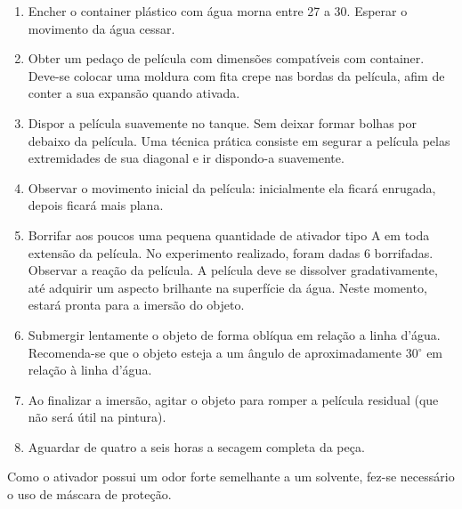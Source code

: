 \begin{enumerate}
\item Encher o container plástico com água morna entre 27 a 30. Esperar o movimento da água cessar. 
\item Obter um pedaço de película com dimensões compatíveis com container. Deve-se colocar uma moldura com fita crepe nas bordas da película, afim de conter a sua expansão quando ativada. 
\item Dispor a película suavemente no tanque. Sem deixar formar bolhas por debaixo da película. Uma técnica prática consiste em segurar a película pelas extremidades de sua diagonal e ir dispondo-a suavemente.
\item Observar o movimento inicial da película: inicialmente ela ficará enrugada, depois ficará mais plana.
\item Borrifar aos poucos uma pequena quantidade de ativador tipo A em toda extensão da película. No experimento realizado, foram dadas 6 borrifadas. Observar a reação da película. A película deve se dissolver gradativamente, até adquirir um aspecto brilhante na superfície da água. Neste momento, estará pronta para a imersão do objeto.
\item Submergir lentamente o objeto de forma oblíqua em relação a linha d'água. Recomenda-se que o objeto esteja a um ângulo de aproximadamente 30$^{\circ}$ em relação à linha d'água.
\item Ao finalizar a imersão, agitar o objeto para romper a película residual (que não será útil na pintura).
\item Aguardar de quatro a seis horas a secagem completa da peça.
\end{enumerate}

Como o ativador possui um odor forte semelhante a um solvente, fez-se necessário o uso de máscara de proteção.
